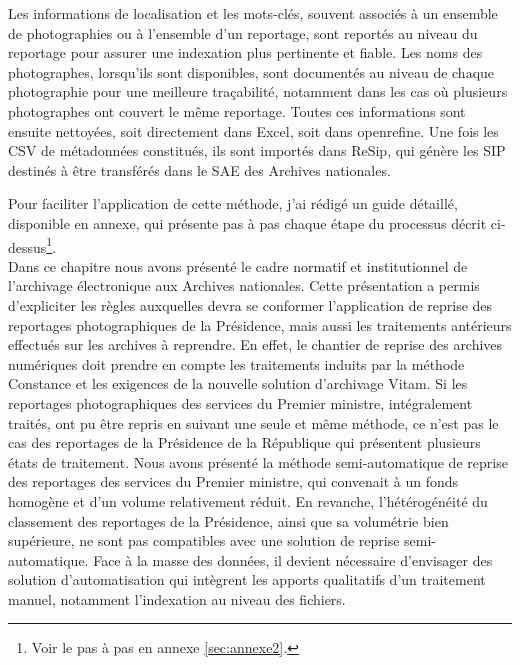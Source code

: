 Les informations de localisation et les mots-clés, souvent associés à un ensemble de photographies ou à l’ensemble d’un reportage, sont reportés au niveau du reportage pour assurer une indexation plus pertinente et fiable. Les noms des photographes, lorsqu’ils sont disponibles, sont documentés au niveau de chaque photographie pour une meilleure traçabilité, notamment dans les cas où plusieurs photographes ont couvert le même reportage. Toutes ces informations sont ensuite nettoyées, soit directement dans Excel, soit dans \gls{openrefine}. Une fois les CSV de métadonnées constitués, ils sont importés dans ReSip, qui génère les SIP destinés à être transférés dans le SAE des Archives nationales. 

Pour faciliter l’application de cette méthode, j’ai rédigé un guide détaillé, disponible en annexe, qui présente pas à pas chaque étape du processus décrit ci-dessus\footnote{Voir le pas à pas en annexe \ref{sec:annexe2}.}.
\\

Dans ce chapitre nous avons présenté le cadre normatif et institutionnel de l'archivage électronique aux Archives nationales. Cette présentation a permis d'expliciter les règles auxquelles devra se conformer l'application de reprise des reportages photographiques de la Présidence, mais aussi les traitements antérieurs effectués sur les archives à reprendre. En effet, le chantier de reprise des archives numériques doit prendre en compte les traitements induits par la méthode Constance et les exigences de la nouvelle solution d'archivage Vitam. Si les reportages photographiques des services du Premier ministre, intégralement traités, ont pu être repris en suivant une seule et même méthode, ce n'est pas le cas des reportages de la Présidence de la République qui présentent plusieurs états de traitement. Nous avons présenté la méthode semi-automatique de reprise des reportages des services du Premier ministre, qui convenait à un fonds homogène et d'un volume relativement réduit. En revanche, l'hétérogénéité du classement des reportages de la Présidence, ainsi que sa volumétrie bien supérieure, ne sont pas compatibles avec une solution de reprise semi-automatique. Face à la masse des données, il devient nécessaire d'envisager des solution d'automatisation qui intègrent les apports qualitatifs d'un traitement manuel, notamment l'indexation au niveau des fichiers. 
